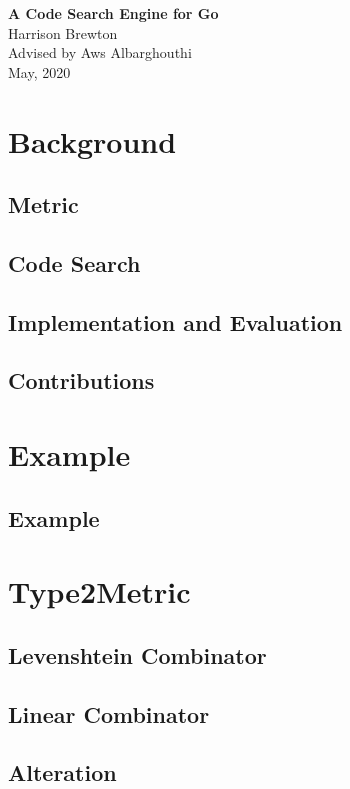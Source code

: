 \documentclass[12pt]{article}
\theoremstyle{plain}
\begin{document}
{\centering \Huge \textbf{A Code Search Engine for Go} \\ 
\vspace{0.5cm}
\Large
Harrison Brewton \\
Advised by Aws Albarghouthi \\ 
May, 2020 \\
}

\section{Background}
\subsection{Metric}

\subsection{Code Search}

\subsection{Implementation and Evaluation}

\subsection{Contributions}

\section{Example}

\subsection{Example}

\section{Type2Metric}

\subsection{Levenshtein Combinator}

\subsection{Linear Combinator}

\subsection{Alteration}

\end{document}
